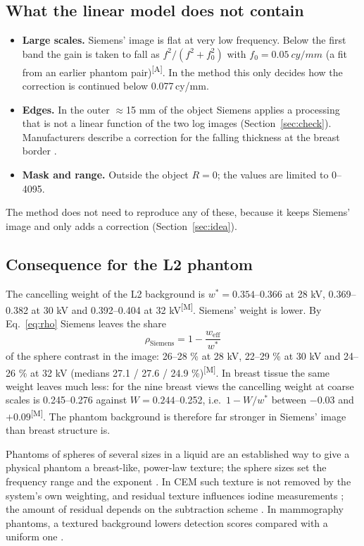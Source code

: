\documentclass[11pt,a4paper]{article}
\newcommand{\weff}{w_\mathrm{eff}}
\newcommand{\ws}{w^{*}}
\newcommand{\M}{\textsuperscript{[M]}}
\newcommand{\As}{\textsuperscript{[A]}}
\newcommand{\cymm}{\,cy/mm}
\begin{document}
\subsection{What the linear model does not contain}\label{sec:nonlinear}
\begin{itemize}
\item \textbf{Large scales.} Siemens' image is flat at very low frequency. Below the first band the gain is taken to
fall as $f^2/(f^2+f_0^2)$ with $f_0=\SI{0.05}{cy/mm}$ (a fit from an earlier phantom pair)\As. In the method this only
decides how the correction is continued below 0.077\cymm.
\item \textbf{Edges.} In the outer $\approx$15 mm of the object Siemens applies a processing that is not a linear
function of the two log images (Section~\ref{sec:check}). Manufacturers describe a correction for the falling
thickness at the breast border \cite{korporaal2018,puong2007}.
\item \textbf{Mask and range.} Outside the object $R=0$; the values are limited to 0--4095.
\end{itemize}
The method does not need to reproduce any of these, because it keeps Siemens' image and only adds a correction
(Section~\ref{sec:idea}).

\subsection{Consequence for the L2 phantom}
The cancelling weight of the L2 background is $\ws=0.354$--0.366 at 28 kV, 0.369--0.382 at 30 kV and 0.392--0.404 at
32 kV\M. Siemens' weight is lower. By Eq.~\eqref{eq:rho} Siemens leaves the share
\begin{equation}
\rho_\mathrm{Siemens} = 1-\frac{\weff}{\ws}
\end{equation}
of the sphere contrast in the image: 26--28 \% at 28 kV, 22--29 \% at 30 kV and 24--26 \% at 32 kV
(medians 27.1 / 27.6 / 24.9 \%)\M. In breast tissue the same weight leaves much less: for the nine breast views the
cancelling weight at coarse scales is 0.245--0.276 against $W=0.244$--0.252, i.e.\ $1-W/\ws$ between $-0.03$ and
$+0.09$\M. The phantom background is therefore far stronger in Siemens' image than breast structure is.

Phantoms of spheres of several sizes in a liquid are an established way to give a physical phantom a breast-like,
power-law texture; the sphere sizes set the frequency range and the exponent \cite{gang2010,cockmartin2013,cockmartin2017}.
In CEM such texture is not removed by the system's own weighting, and residual texture influences iodine
measurements \cite{cockmartin2023,ding2017}; the amount of residual depends on the subtraction scheme
\cite{contillo2016}. In mammography phantoms, a textured background lowers detection scores compared with a uniform
one \cite{ikejimba2016}.
\end{document}
